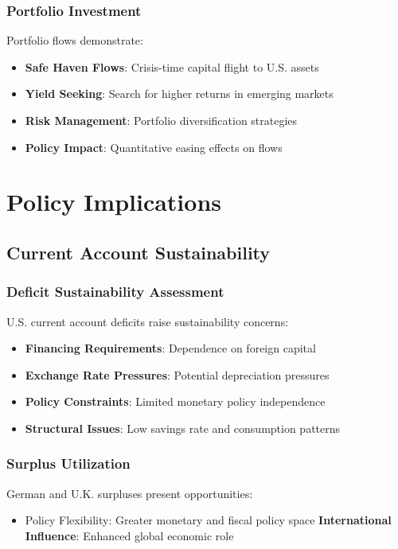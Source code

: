 \documentclass[11pt,a4paper]{article}
\begin{document}
\subsubsection{Portfolio Investment}
Portfolio flows demonstrate:

\begin{itemize}
    \item \textbf{Safe Haven Flows}: Crisis-time capital flight to U.S. assets
    \item \textbf{Yield Seeking}: Search for higher returns in emerging markets
    \item \textbf{Risk Management}: Portfolio diversification strategies
    \item \textbf{Policy Impact}: Quantitative easing effects on flows
\end{itemize}

\section{Policy Implications}

\subsection{Current Account Sustainability}

\subsubsection{Deficit Sustainability Assessment}
U.S. current account deficits raise sustainability concerns:

\begin{itemize}
    \item \textbf{Financing Requirements}: Dependence on foreign capital
    \item \textbf{Exchange Rate Pressures}: Potential depreciation pressures
    \item \textbf{Policy Constraints}: Limited monetary policy independence
    \item \textbf{Structural Issues}: Low savings rate and consumption patterns
\end{itemize}

\subsubsection{Surplus Utilization}
German and U.K. surpluses present opportunities:

\begin{itemize}
    \textbf{Investment Capacity}: Resources for domestic and foreign investment
    \textbf{External Buffer}: Protection against external shocks
    \item{Policy Flexibility}: Greater monetary and fiscal policy space
    \textbf{International Influence}: Enhanced global economic role
\end{itemize}
\end{document}

